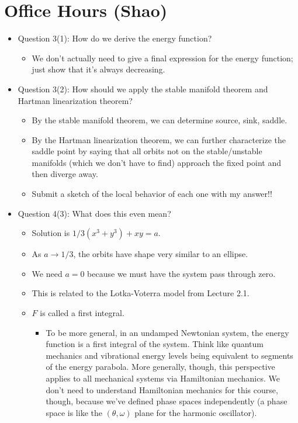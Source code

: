 \documentclass[../notes.tex]{subfiles}
\begin{document}
\section{Office Hours (Shao)}
\begin{itemize}
    \item Question 3(1): How do we derive the energy function?
    \begin{itemize}
        \item We don't actually need to give a final expression for the energy function; just show that it's always decreasing.
    \end{itemize}
    \item Question 3(2): How should we apply the stable manifold theorem and Hartman linearization theorem?
    \begin{itemize}
        \item By the stable manifold theorem, we can determine source, sink, saddle.
        \item By the Hartman linearization theorem, we can further characterize the saddle point by saying that all orbits not on the stable/unstable manifolds (which we don't have to find) approach the fixed point and then diverge away.
        \item Submit a sketch of the local behavior of each one with my answer!!
    \end{itemize}
    \item Question 4(3): What does this even mean?
    \begin{itemize}
        \item Solution is $1/3(x^3+y^3)+xy=a$.
        \item As $a\to 1/3$, the orbits have shape very similar to an ellipse.
        \item We need $a=0$ because we must have the system pass through zero.
        \item This is related to the Lotka-Voterra model from Lecture 2.1.
        \item $F$ is called a first integral.
        \begin{itemize}
            \item To be more general, in an undamped Newtonian system, the energy function is a first integral of the system. Think like quantum mechanics and vibrational energy levels being equivalent to segments of the energy parabola. More generally, though, this perspective applies to all mechanical systems via Hamiltonian mechanics. We don't need to understand Hamiltonian mechanics for this course, though, because we've defined phase spaces independently (a phase space is like the $(\theta,\omega)$ plane for the harmonic oscillator).

\end{itemize}
\end{itemize}
\end{itemize}
\end{document}
